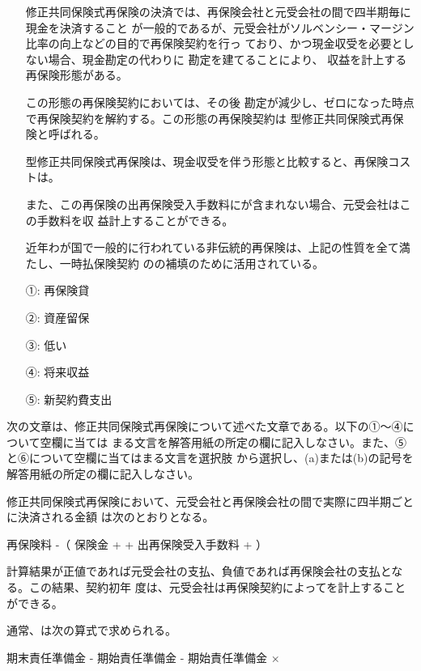 \documentclass[report,gutter=10mm,fore-edge=10mm,uplatex,dvipdfmx]{jlreq}
\begin{document}
\begin{itemize}
\item[] 修正共同保険式再保険の決済では、再保険会社と元受会社の間で四半期毎に現金を決済すること
 が一般的であるが、元受会社がソルベンシー・マージン比率の向上などの目的で再保険契約を行っ
 ており、かつ現金収受を必要としない場合、現金勘定の代わりに
 勘定を建てることにより、 収益を計上する再保険形態がある。

\item[] この形態の再保険契約においては、その後
 勘定が減少し、ゼロになった時点で再保険契約を解約する。この形態の再保険契約は
 型修正共同保険式再保険と呼ばれる。
\item[] 型修正共同保険式再保険は、現金収受を伴う形態と比較すると、再保険コストは。
\item[] また、この再保険の出再保険受入手数料にが含まれない場合、元受会社はこの手数料を収
 益計上することができる。
\item[] 近年わが国で一般的に行われている非伝統的再保険は、上記の性質を全て満たし、一時払保険契約
 のの補填のために活用されている。
\end{itemize}
\answer{}
\begin{itemize}
\item[ ①: ] 再保険貸
\item[ ②: ] 資産留保
\item[ ③: ] 低い
\item[ ④: ] 将来収益
\item[ ⑤: ] 新契約費支出
\end{itemize}

次の文章は、修正共同保険式再保険について述べた文章である。以下の①～④について空欄に当ては
まる文言を解答用紙の所定の欄に記入しなさい。また、⑤と⑥について空欄に当てはまる文言を選択肢
から選択し、(a)または(b)の記号を解答用紙の所定の欄に記入しなさい。

修正共同保険式再保険において、元受会社と再保険会社の間で実際に四半期ごとに決済される金額
は次のとおりとなる。

再保険料 -（ 保険金 +   + 出再保険受入手数料 +  ）

計算結果が正値であれば元受会社の支払、負値であれば再保険会社の支払となる。この結果、契約初年
度は、元受会社は再保険契約によってを計上することができる。

通常、は次の算式で求められる。

期末責任準備金 - 期始責任準備金 - 期始責任準備金 ×
\end{document}
